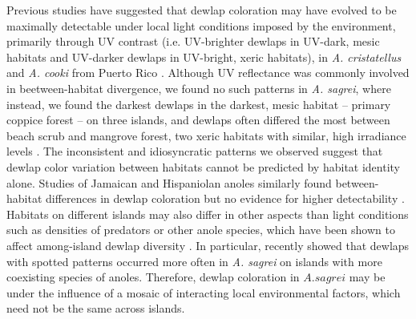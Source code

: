 Previous studies have suggested that dewlap coloration may have evolved to be maximally detectable under local light conditions imposed by the environment, primarily through UV contrast (i.e. UV-brighter dewlaps in UV-dark, mesic habitats and UV-darker dewlaps in UV-bright, xeric habitats), in \textit{A. cristatellus} and \textit{A. cooki} from Puerto Rico \citep{Leal2002, Leal2004}. Although UV reflectance was commonly involved in beetween-habitat divergence, we found no such patterns in \textit{A. sagrei}, where instead, we found the darkest dewlaps in the darkest, mesic habitat -- primary coppice forest -- on three islands, and dewlaps often differed the most between beach scrub and mangrove forest, two xeric habitats with similar, high irradiance levels \citep{Howard1950, Schoener1968}. The inconsistent and idiosyncratic patterns we observed suggest that dewlap color variation between habitats cannot be predicted by habitat identity alone. Studies of Jamaican and Hispaniolan anoles similarly found between-habitat differences in dewlap coloration but no evidence for higher detectability \citep{Fleishman2009, Ng2012}. Habitats on different islands may also differ in other aspects than light conditions such as densities of predators or other anole species, which have been shown to affect among-island dewlap diversity \citep{Vanhooydonck2009, Baeckens2018}. In particular, \citet{Baeckens2018} recently showed that dewlaps with spotted patterns occurred more often in \textit{A. sagrei} on islands with more coexisting species of anoles. Therefore, dewlap coloration in $A. sagrei$ may be under the influence of a mosaic of interacting local environmental factors, which need not be the same across islands.


